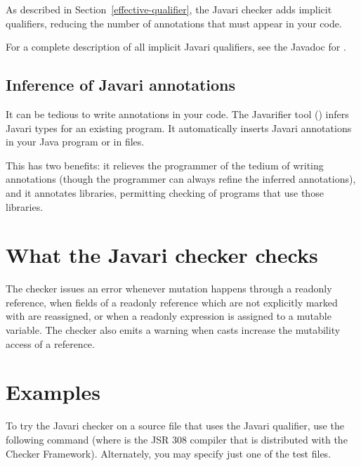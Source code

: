 As described in Section~\ref{effective-qualifier}, the Javari checker
adds implicit qualifiers, reducing the number of annotations that must
appear in your code.

For a complete description of all implicit Javari qualifiers, see the
Javadoc for .


\subsection{Inference of Javari annotations\label{javari-inference}}

It can be tedious to write annotations in your code.  The Javarifier tool
() infers 
Javari types for an existing program.  It 
automatically inserts Javari annotations in your Java program or
in  files.

This has two benefits:  it relieves the programmer of the tedium of writing
annotations (though the programmer can always refine the inferred
annotations), and it annotates libraries, permitting checking of programs
that use those libraries.



\section{What the Javari checker checks\label{javari-checks}}

The checker issues an error whenever mutation happens through a readonly
reference, when fields of a readonly reference which are not explicitly
marked with  are reassigned, or
when a readonly expression is assigned to a mutable variable.  The checker
also emits a warning when casts increase the mutability access of a
reference.



\section{Examples\label{javari-examples}}

To try the Javari checker on a source file that uses the Javari
qualifier, use the following command (where  is the JSR 308
compiler  that
is distributed with the Checker Framework).  Alternately, you may
specify just one of the test files.

